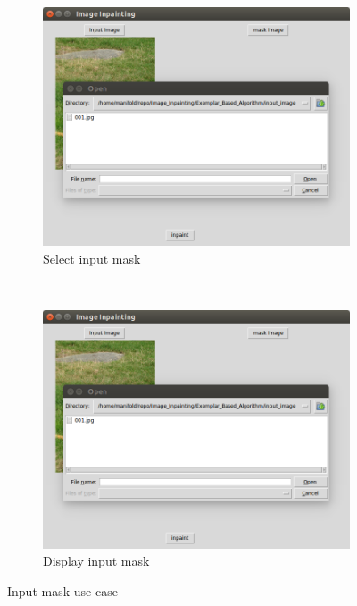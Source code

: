 \begin{figure}[H]
\centering
\begin{subfigure}{0.45\textwidth}
\includegraphics[width=\textwidth]{ex_mask.png}
\caption{Select input mask}
\end{subfigure}
~
\begin{subfigure}{0.45\textwidth}
\includegraphics[width=\textwidth]{ex_mask.png}
\caption{Display input mask}
\end{subfigure}
\caption{Input mask use case}
\end{figure}

